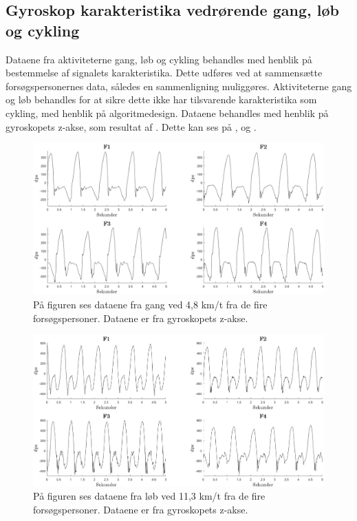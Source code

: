 \subsection{Gyroskop karakteristika vedrørende gang, løb og cykling}
Dataene fra aktiviteterne gang, løb og cykling behandles med henblik på bestemmelse af signalets karakteristika. Dette udføres ved at sammensætte forsøgspersonernes data, således en sammenligning muliggøres. Aktiviteterne gang og løb behandles for at sikre dette ikke har tilsvarende karakteristika som cykling, med henblik på algoritmedesign. Dataene behandles med henblik på gyroskopets z-akse, som resultat af . Dette kan ses på ,  og .
\begin{figure}[H]
	\centering
	\includegraphics[width=1\textwidth]{figures/qBilag/gang_gyro}
	\caption{På figuren ses dataene fra gang ved 4,8 km/t fra de fire forsøgspersoner. Dataene er fra gyroskopets z-akse.}
	\label{fig:Ap_cykling1}
\end{figure}\vspace{-.25cm}

\begin{figure}[H]
	\centering
	\includegraphics[width=1\textwidth]{figures/qBilag/loeb_gyro}
	\caption{På figuren ses dataene fra løb ved 11,3 km/t fra de fire forsøgspersoner. Dataene er fra gyroskopets z-akse.}
	\label{fig:Ap_cykling2}
\end{figure}\vspace{-.25cm}

